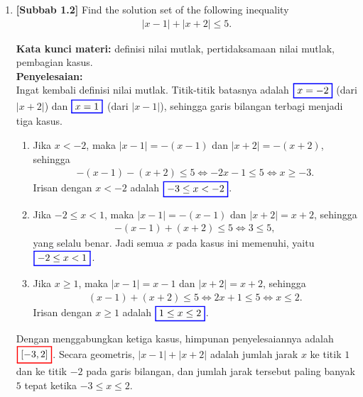 \documentclass[10pt,openany,a4paper]{article}
\theoremstyle{definition}
\theoremstyle{definition}
\theoremstyle{plain}
\newenvironment{jawab}[2][tes]{%
\par\noindent\textbf{Kata kunci materi:} #1.\\
\textbf{Penyelesaian:} #2%
}{}
\begin{document}
\begin{enumerate}
    \item \textbf{[Subbab 1.2]} Find the solution set of the following inequality
    \begin{align*}
        |x-1|+|x+2|\leq 5.
    \end{align*}
    \begin{jawab}[definisi nilai mutlak, pertidaksamaan nilai mutlak, pembagian kasus]{~\\
        Ingat kembali definisi nilai mutlak. Titik-titik batasnya adalah $\colorlet{oldcolor}{.}
        \color{blue}
        \setlength{\fboxrule}{1pt} \boxed{\color{oldcolor}x=-2}\color{oldcolor}$ (dari $|x+2|$) dan $\colorlet{oldcolor}{.}
        \color{blue}
        \setlength{\fboxrule}{1pt} \boxed{\color{oldcolor}x=1}\color{oldcolor}$ (dari $|x-1|$), sehingga garis bilangan terbagi menjadi tiga kasus.
        \begin{enumerate}
            \item[(i)] Jika $x<-2$, maka $|x-1|=-(x-1)$ dan $|x+2|=-(x+2)$, sehingga
            \begin{align*}
                -(x-1)-(x+2)\leq 5 \iff -2x-1\leq 5 \iff x\geq -3.
            \end{align*}
            Irisan dengan $x<-2$ adalah $\colorlet{oldcolor}{.}
        \color{blue}
        \setlength{\fboxrule}{1pt} \boxed{\color{oldcolor}-3\leq x<-2}\color{oldcolor}$.
            \item[(ii)] Jika $-2\leq x<1$, maka $|x-1|=-(x-1)$ dan $|x+2|=x+2$, sehingga
            \begin{align*}
                -(x-1)+(x+2)\leq 5 \iff 3\leq 5,
            \end{align*}
            yang selalu benar. Jadi semua $x$ pada kasus ini memenuhi, yaitu $\colorlet{oldcolor}{.}
        \color{blue}
        \setlength{\fboxrule}{1pt} \boxed{\color{oldcolor}-2\leq x<1}\color{oldcolor}$.
            \item[(iii)] Jika $x\geq 1$, maka $|x-1|=x-1$ dan $|x+2|=x+2$, sehingga
            \begin{align*}
                (x-1)+(x+2)\leq 5 \iff 2x+1\leq 5 \iff x\leq 2.
            \end{align*}
            Irisan dengan $x\geq 1$ adalah $\colorlet{oldcolor}{.}
        \color{blue}
        \setlength{\fboxrule}{1pt} \boxed{\color{oldcolor}1\leq x\leq 2}\color{oldcolor}$.
        \end{enumerate}
        Dengan menggabungkan ketiga kasus, himpunan penyelesaiannya adalah $\colorlet{oldcolor}{.}
        \color{red}
        \setlength{\fboxrule}{1pt} \boxed{\color{oldcolor}[-3,2]}\color{oldcolor}$. Secara geometris, $|x-1|+|x+2|$ adalah jumlah jarak $x$ ke titik $1$ dan ke titik $-2$ pada garis bilangan, dan jumlah jarak tersebut paling banyak $5$ tepat ketika $-3\leq x\leq 2$.
    }
    \end{jawab}


\end{enumerate}
\end{document}
